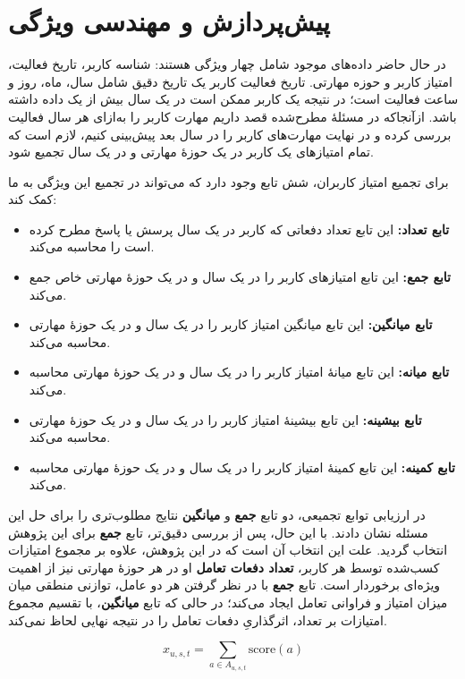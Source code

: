 \section{پیش‌پردازش  و مهندسی ویژگی}
در حال حاضر داده‌های موجود شامل چهار ویژگی هستند: شناسه کاربر، تاریخ فعالیت، امتیاز کاربر و حوزه مهارتی. تاریخ فعالیت کاربر یک تاریخ دقیق شامل سال، ماه، روز و ساعت فعالیت است؛ در نتیجه یک کاربر ممکن است در یک سال بیش از یک داده داشته باشد. ازآنجاکه در مسئلهٔ مطرح‌شده قصد داریم مهارت کاربر را به‌ازای هر سال فعالیت بررسی کرده و در نهایت مهارت‌های کاربر را در سال بعد پیش‌بینی کنیم، لازم است که تمام امتیازهای یک کاربر در یک حوزهٔ مهارتی و در یک سال تجمیع شود.

برای تجمیع امتیاز کاربران، شش تابع وجود دارد که می‌تواند در تجمیع این ویژگی به ما کمک کند:
\begin{itemize}
   \item \textbf{تابع تعداد: } این تابع تعداد دفعاتی که کاربر در یک سال پرسش یا پاسخ مطرح کرده است را محاسبه می‌کند.
   \item \textbf{تابع جمع: } این تابع امتیازهای کاربر را در یک سال و در یک حوزهٔ مهارتی خاص جمع می‌کند.
   \item \textbf{تابع میانگین: } این تابع میانگین امتیاز کاربر را در یک سال و در یک حوزهٔ مهارتی محاسبه می‌کند.
   \item \textbf{تابع میانه: } این تابع میانهٔ امتیاز کاربر را در یک سال و در یک حوزهٔ مهارتی محاسبه می‌کند.
   \item \textbf{تابع بیشینه: } این تابع بیشینهٔ امتیاز کاربر را در یک سال و در یک حوزهٔ مهارتی محاسبه می‌کند.
   \item \textbf{تابع کمینه: } این تابع کمینهٔ امتیاز کاربر را در یک سال و در یک حوزهٔ مهارتی محاسبه می‌کند.
 \end{itemize}

 در ارزیابی توابع تجمیعی، دو تابع \textbf{جمع} و \textbf{میانگین} نتایج مطلوب‌تری را برای حل این مسئله نشان دادند. با این حال، پس از بررسی دقیق‌تر، تابع \textbf{جمع} برای این پژوهش انتخاب گردید. علت این انتخاب آن است که در این پژوهش، علاوه بر مجموع امتیازات کسب‌شده توسط هر کاربر، \textbf{تعداد دفعات تعامل} او در هر حوزهٔ مهارتی نیز از اهمیت ویژه‌ای برخوردار است. تابع \textbf{جمع} با در نظر گرفتن هر دو عامل، توازنی منطقی میان میزان امتیاز و فراوانی تعامل ایجاد می‌کند؛ در حالی که تابع \textbf{میانگین}، با تقسیم مجموع امتیازات بر تعداد، اثرگذاریِ دفعات تعامل را در نتیجه نهایی لحاظ نمی‌کند.

 \begin{equation}
   x_{u,s,t} = \sum_{a \in A_{u,s,t}} \text{score}(a)
   \end{equation}

